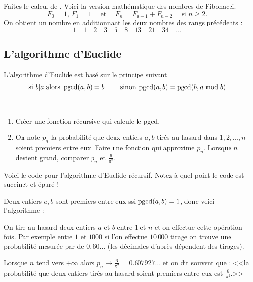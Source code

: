 \documentclass[class=report,crop=false]{standalone}
\begin{document}

Faites-le calcul de . Voici la version mathématique des nombres de Fibonacci.
$$F_0 = 1, \ F_1 = 1 \quad \text{ et } \quad F_{n} = F_{n-1} + F_{n-2} \quad  \text{ si } n \ge 2.$$
On obtient un nombre en additionnant les deux nombres des rangs précédents :
$$1 \quad 1 \quad 2 \quad 3 \quad 5 \quad 8 \quad 13 \quad 21 \quad 34 \quad \ldots$$





\subsection{L'algorithme d'Euclide}

L’algorithme d'Euclide est basé sur le principe suivant
$$\text{si } b | a \text{ alors } \mathop{\mathrm{pgcd}}\nolimits(a,b)=b  \qquad \text{ sinon } \mathop{\mathrm{pgcd}}\nolimits(a,b) = \mathop{\mathrm{pgcd}}\nolimits(b, a \bmod b)$$

\begin{tp}~
\begin{enumerate}
  \item Créer une fonction récursive  qui calcule le pgcd.
  \item On note $p_n$ la probabilité que deux entiers $a,b$ tirés au hasard dans
  ${1,2,\ldots,n}$ soient premiers entre eux. Faire une fonction qui approxime $p_n$.
  Lorsque $n$ devient grand, comparer $p_n$ et $\frac{6}{\pi^2}$.
\end{enumerate}
\end{tp}


Voici le code pour l'algorithme d'Euclide récursif. Notez à quel point le code est succinct et épuré !



Deux entiers $a,b$ sont premiers entre eux ssi $\mathop{\mathrm{pgcd}}\nolimits(a,b)=1$, donc voici l'algorithme :




On tire au hasard deux entiers $a$ et $b$ entre $1$ et $n$ et on effectue cette opération
 fois.
Par exemple entre $1$ et $1000$ si l'on effectue $10\, 000$ tirage on trouve une probabilité
mesurée par  de $0,60\ldots$ (les décimales d'après dépendent des tirages).

Lorsque $n$ tend vers $+\infty$ alors $p_n \to \frac{6}{\pi^2} = 0.607927\ldots$ et on dit souvent que :
<<la probabilité que deux entiers tirés au hasard soient premiers entre eux est $\frac{6}{\pi^2}$.>>
\end{document}
